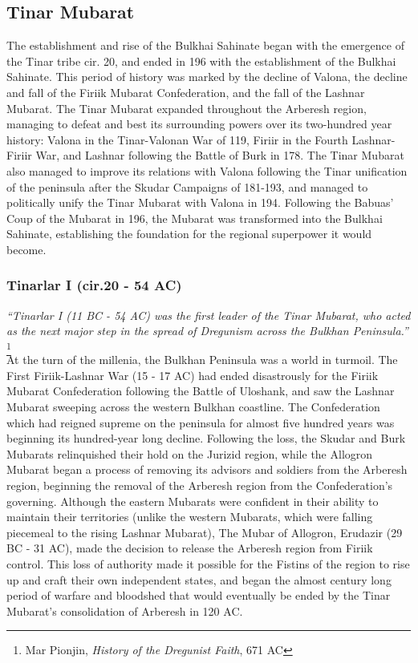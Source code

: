 \begin{multicols}{2}
		\subsection{Tinar Mubarat}
			The establishment and rise of the Bulkhai Sahinate began with the emergence of the Tinar tribe cir. 20, and ended in 196 with the establishment of the Bulkhai Sahinate. This period of history was marked by the decline of Valona, the decline and fall of the Firiik Mubarat Confederation, and the fall of the Lashnar Mubarat. The Tinar Mubarat expanded throughout the Arberesh region, managing to defeat and best its surrounding powers over its two-hundred year history: Valona in the Tinar-Valonan War of 119, Firiir in the Fourth Lashnar-Firiir War, and Lashnar following the Battle of Burk in 178. The Tinar Mubarat also managed to improve its relations with Valona following the Tinar unification of the peninsula after the Skudar Campaigns of 181-193, and managed to politically unify the Tinar Mubarat with Valona in 194. Following the Babuas' Coup of the Mubarat in 196, the Mubarat was transformed into the Bulkhai Sahinate, establishing the foundation for the regional superpower it would become.
			\subsubsection{Tinarlar I (cir.20 - 54 AC)}
					\textit{``Tinarlar I (11 BC - 54 AC) was the first leader of the Tinar Mubarat, who acted as the next major step in the spread of Dregunism across the Bulkhan Peninsula.''} \footnote{Mar Pionjin, \textit{History of the Dregunist Faith}, 671 AC}\\
						At the turn of the millenia, the Bulkhan Peninsula was a world in turmoil. The First Firiik-Lashnar War (15 - 17 AC) had ended disastrously for the Firiik Mubarat Confederation following the Battle of Uloshank, and saw the Lashnar Mubarat sweeping across the western Bulkhan coastline. The Confederation which had reigned supreme on the peninsula for almost five hundred years was beginning its hundred-year long decline. Following the loss, the Skudar and Burk Mubarats relinquished their hold on the Jurizid region, while the Allogron Mubarat began a process of removing its advisors and soldiers from the Arberesh region, beginning the removal of the Arberesh region from the Confederation's governing. Although the eastern Mubarats were confident in their ability to maintain their territories (unlike the western Mubarats, which were falling piecemeal to the rising Lashnar Mubarat), The Mubar of Allogron, Erudazir (29 BC - 31 AC), made the decision to release the Arberesh region from Firiik control. This loss of authority made it possible for the Fistins of the region to rise up and craft their own independent states, and began the almost century long period of warfare and bloodshed that would eventually be ended by the Tinar Mubarat's consolidation of Arberesh in 120 AC. 
						

\end{multicols}
